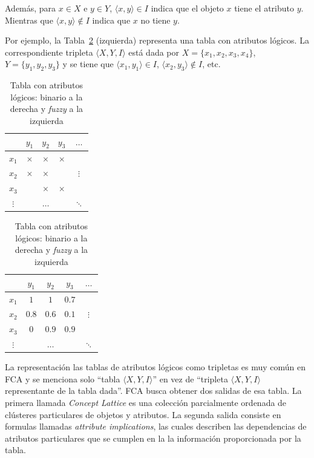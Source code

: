 \documentclass[12pt,oneside,letterpaper]{book}
\newcommand{\eng}[1]{\textit{#1}\xspace}			%
\newcommand{\abr}[1]{\textsc{#1}\xspace}           %
\theoremstyle{definition}
\begin{document}
Además, para $x \in X$ e $y \in Y$, $\langle x,y\rangle \in I$ indica que el objeto $x$ tiene el atributo $y$. Mientras que $\langle x,y \rangle \notin I$ indica que $x$ no tiene $y$.

\clearpage
Por ejemplo, la Tabla~\ref{tbl:table_logical_attributes} (izquierda) representa una tabla con atributos lógicos. La correspondiente tripleta $\langle X,Y,I \rangle$ está dada por $X = \{x_1,x_2,x_3, x_4\}$, $Y = \{y_1,y_2,y_3\}$ y se tiene que $\langle x_1,y_1 \rangle \in I$, $\langle x_2,y_3 \rangle \notin I$, etc.
\begin{table}[h!]
	\centering
	\begin{minipage}[b]{0.49\textwidth}
		\begin{tabular}{|c|cccc|}
			\hline
				  & $y_1$	 & $y_2$ 	& $y_3$	   & $\dots$ \\
			\hline
			$x_1$ & $\times$ & $\times$ & $\times$ & 		  \\
			$x_2$ & $\times$ & $\times$ & 		   & $\vdots$ \\
			$x_3$ & 		 & $\times$ & $\times$ & 		  \\
			$\vdots$ & 		 & $\dots$	& 		   & $\ddots$ \\
			\hline		 	
		\end{tabular}
	\end{minipage}
	\begin{minipage}[b]{0.49\textwidth}
		\begin{tabular}{|c|cccc|}
			\hline
					 & $y_1$ & $y_2$   	& $y_3$ & $\dots$	\\
			\hline
			$x_1$	 & $1$ 	 & $1$	 	& $0.7$ & 			\\
			$x_2$	 & $0.8$ & $0.6$ 	& $0.1$ & $\vdots$	\\
			$x_3$	 & $0$	 & $0.9$ 	& $0.9$ & 			\\
			$\vdots$ & 		 & $\dots$	& 		& $\ddots$ 	\\
			\hline		 	
		\end{tabular}
	\end{minipage}
	\caption{Tabla con atributos lógicos: binario a la derecha y \eng{fuzzy} a la izquierda}
	\label{tbl:table_logical_attributes}
\end{table}

La representación las tablas de atributos lógicos como tripletas es muy común en \abr{FCA} y se menciona solo ``tabla $\langle X,Y,I \rangle$'' en vez de ``tripleta $\langle X,Y,I \rangle$ representante de la tabla dada''. \abr{FCA} busca obtener dos salidas de esa tabla. La primera llamada \eng{Concept Lattice} es una colección parcialmente ordenada de clústeres particulares de objetos y atributos. La segunda salida consiste en formulas llamadas \eng{attribute implications}, las cuales describen las dependencias de atributos particulares que se cumplen en la la información proporcionada por la tabla.
\end{document}
